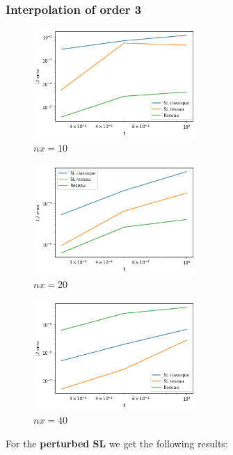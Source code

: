 \documentclass{article}
\begin{document}
\subsubsection{Interpolation of order 3}
\begin{figure}[!h]
    \centering
    \includegraphics[width=0.55\textwidth]{images/i310.png}
    \caption{$nx = 10$}
\end{figure}
\begin{figure}[!h]
    \centering
    \includegraphics[width=0.55\textwidth]{images/i320.png}
    \caption{$nx = 20$}
\end{figure}
\begin{figure}[!h]
    \centering
    \includegraphics[width=0.55\textwidth]{images/i3.png}
    \caption{$nx = 40$}
\end{figure}

For the \textbf{perturbed SL} we get the following results:
\end{document}
